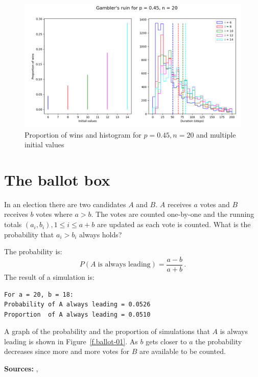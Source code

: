 \documentclass[11pt,a4paper]{article}
\newcommand*{\disfrac}[2]{\displaystyle\frac{#1}{#2}}
\begin{document}
\begin{figure}
\begin{center}
\includegraphics[width=\textwidth]{gamblers-ruin-02}
\caption{Proportion of wins and histogram for $p=0.45, n=20$ and multiple initial values}\label{f.gambler-hist2}
\end{center}
\end{figure}


\section{The ballot box}\label{s.ballot}

In an election there are two candidates $A$ and $B$.  $A$ receives $a$ votes and $B$ receives $b$ votes where $a>b$. The votes are counted one-by-one and the running totals $(a_i,b_i), 1\leq i \leq a+b$ are updated as each vote is counted. What is the probability that $a_i>b_i$ always holds?

The probability is:
\[
P(A \;\textrm{is always leading}) = \disfrac{a-b}{a+b}\,.
\]
The result of a simulation is:
\begin{verbatim}
For a = 20, b = 18:
Probability of A always leading = 0.0526
Proportion  of A always leading = 0.0510
\end{verbatim}
A graph of the probability and the proportion of simulations that $A$ is always leading is shown in Figure~\ref{f.ballot-01}. As $b$ gets closer to $a$ the probability decreases since more and more votes for $B$ are available to be counted.

\textbf{Sources:} \cite[Problem 22]{mosteller,mos}, \cite[Section 16.3]{border}
\end{document}
